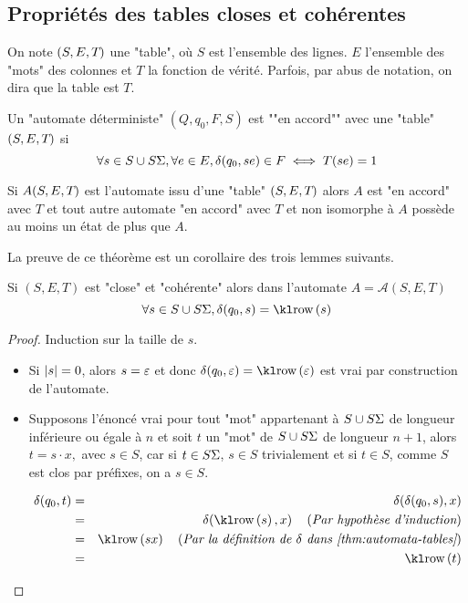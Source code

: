 \subsection{Propriétés des tables closes et cohérentes}

\begin{notation}
	On note $(S, E, T_{})$ une "table", où $S$ est l'ensemble des lignes. $E$ l'ensemble des "mots" des colonnes et $T$ la fonction de vérité.
	Parfois, par abus de notation, on dira que la table est $T$.
\end{notation}

\begin{definition}
	Un "automate déterministe" $(Q, q_0, F, S)$ est ""en accord"" avec une "table" $(S, E, T_{})$ si
	$$ \forall s \in S \cup S\Sigma, \forall e \in E, \delta(q_0,se) \in F \iff T(se) = 1$$
\end{definition}

\begin{theorem}
	Si $A(S, E, T_{})$ est l'automate issu d'une "table" $(S, E, T_{})$ alors $A$ est "en accord" avec $T$ et tout autre
	automate "en accord" avec $T$ et non isomorphe à $A$ possède au moins un état de plus que $A$.
\end{theorem}

La preuve de ce théorème est un corollaire des trois lemmes suivants.

\begin{lemma} \label{lem:learning-9}
	Si $(S,E,T)$ est "close" et "cohérente" alors dans l'automate $A = \mathcal A (S,E,T)$
	$$\forall s \in S \cup S\alphabet, \delta(q_0,s) = \row s$$
\end{lemma}

\begin{proof}
	Induction sur la taille de $s$.
	\begin{itemize}
		\item Si $|s| = 0$, alors $s = \varepsilon$ et donc $\delta(q_0, \motvide) = \row \motvide$
		      est vrai par construction de l'automate.
		\item Supposons l'énoncé vrai pour tout "mot" appartenant à $S \cup S\Sigma$ de longueur inférieure ou égale à $n$ et
		      soit $t$ un "mot" de $S \cup S\Sigma$ de longueur $n +1$, alors $ t  = s \cdot x,$ avec $s \in S$, car
		      si $t \in S\Sigma$, $s \in S$ trivialement et si $t \in S$, comme $S$ est clos par préfixes, on a $s \in S$.

		      \begin{eqnarray*}
			      \delta(q_0, t) &=& \delta(\delta(q_0, s), x) \\
			      &=& \delta(\row s, x)  \reason {Par hypothèse d'induction} \\
			      &=& \row {sx}  \reason {Par la définition de $\delta$ dans \ref{thm:automata-tables}} \\
			      &=& \row t
		      \end{eqnarray*}
	\end{itemize}
\end{proof}


